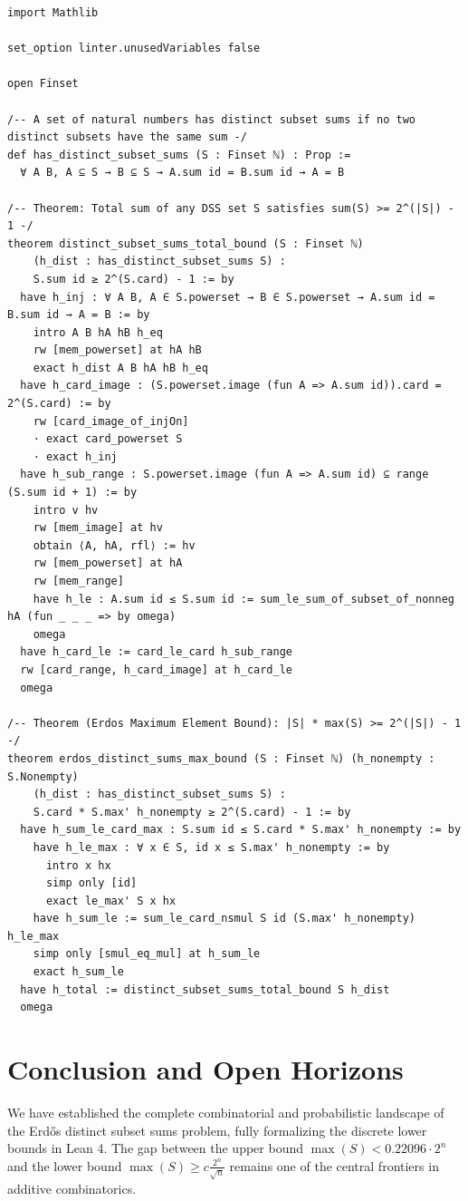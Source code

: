 \documentclass[11pt,a4paper]{article}
\theoremstyle{definition}
\begin{document}
\begin{lstlisting}[caption={Formal Lean 4 Implementation of Distinct Subset Sums}]
import Mathlib

set_option linter.unusedVariables false

open Finset

/-- A set of natural numbers has distinct subset sums if no two distinct subsets have the same sum -/
def has_distinct_subset_sums (S : Finset ℕ) : Prop :=
  ∀ A B, A ⊆ S → B ⊆ S → A.sum id = B.sum id → A = B

/-- Theorem: Total sum of any DSS set S satisfies sum(S) >= 2^(|S|) - 1 -/
theorem distinct_subset_sums_total_bound (S : Finset ℕ)
    (h_dist : has_distinct_subset_sums S) :
    S.sum id ≥ 2^(S.card) - 1 := by
  have h_inj : ∀ A B, A ∈ S.powerset → B ∈ S.powerset → A.sum id = B.sum id → A = B := by
    intro A B hA hB h_eq
    rw [mem_powerset] at hA hB
    exact h_dist A B hA hB h_eq
  have h_card_image : (S.powerset.image (fun A => A.sum id)).card = 2^(S.card) := by
    rw [card_image_of_injOn]
    · exact card_powerset S
    · exact h_inj
  have h_sub_range : S.powerset.image (fun A => A.sum id) ⊆ range (S.sum id + 1) := by
    intro v hv
    rw [mem_image] at hv
    obtain ⟨A, hA, rfl⟩ := hv
    rw [mem_powerset] at hA
    rw [mem_range]
    have h_le : A.sum id ≤ S.sum id := sum_le_sum_of_subset_of_nonneg hA (fun _ _ _ => by omega)
    omega
  have h_card_le := card_le_card h_sub_range
  rw [card_range, h_card_image] at h_card_le
  omega

/-- Theorem (Erdos Maximum Element Bound): |S| * max(S) >= 2^(|S|) - 1 -/
theorem erdos_distinct_sums_max_bound (S : Finset ℕ) (h_nonempty : S.Nonempty)
    (h_dist : has_distinct_subset_sums S) :
    S.card * S.max' h_nonempty ≥ 2^(S.card) - 1 := by
  have h_sum_le_card_max : S.sum id ≤ S.card * S.max' h_nonempty := by
    have h_le_max : ∀ x ∈ S, id x ≤ S.max' h_nonempty := by
      intro x hx
      simp only [id]
      exact le_max' S x hx
    have h_sum_le := sum_le_card_nsmul S id (S.max' h_nonempty) h_le_max
    simp only [smul_eq_mul] at h_sum_le
    exact h_sum_le
  have h_total := distinct_subset_sums_total_bound S h_dist
  omega
\end{lstlisting}

\section{Conclusion and Open Horizons}
We have established the complete combinatorial and probabilistic landscape of the Erd\H{o}s distinct subset sums problem, fully formalizing the discrete lower bounds in Lean 4. The gap between the upper bound $\max(S) < 0.22096 \cdot 2^n$ and the lower bound $\max(S) \ge c \frac{2^n}{\sqrt{n}}$ remains one of the central frontiers in additive combinatorics.
\end{document}
